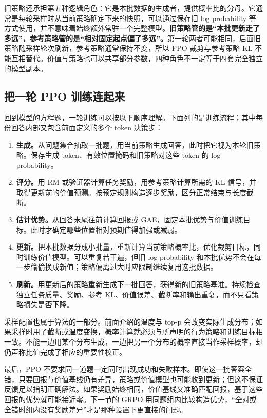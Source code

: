 旧策略还承担第五种逻辑角色：它是本批数据的生成者，提供概率比的分母。它通常是每轮采样时从当前策略确定下来的快照，可以通过保存旧 log probability 等方式使用，并不意味着始终额外常驻一个完整模型。\textbf{旧策略管的是``本批更新走了多远''，参考策略管的是``相对固定起点偏了多远''。}第一轮两者可能相同，后面旧策略随采样轮次刷新，参考策略通常保持不变，所以 PPO 裁剪与参考策略 KL 不能互相替代。价值与策略也可以共享部分参数，四种角色不一定等于四套完全独立的模型副本。

\subsection{把一轮 PPO 训练连起来}

回到模型的方程题，一轮训练可以按以下顺序理解。下面列的是训练流程；其中每份回答内部又包含前面定义的多个 token 决策步：
\begin{enumerate}
    \item \textbf{生成。}从问题集合抽取一批题，用当前策略生成回答，此时把它视为本轮旧策略。保存生成 token、有效位置掩码和旧策略对这些 token 的 log probability。
    \item \textbf{评分。}用 RM 或验证器计算任务奖励，用参考策略计算所需的 KL 信号，并取得更新前的价值预测。按预定规则构造逐步奖励，区分正常结束与长度截断。
    \item \textbf{估计优势。}从回答末尾往前计算回报或 GAE，固定本批优势与价值训练目标。此时才确定哪些位置相对预期值得加强或减弱。
    \item \textbf{更新。}把本批数据分成小批量，重新计算当前策略概率比，优化裁剪目标，同时训练价值模型。可以重复若干遍，但旧 log probability 和本批优势不会在每一步偷偷换成新值；策略偏离过大时应限制继续复用这批数据。
    \item \textbf{刷新。}用更新后的策略重新生成下一批回答，获得新的旧策略基准。持续检查独立任务质量、奖励、参考 KL、价值误差、截断率和输出重复，而不只看策略损失是否下降。
\end{enumerate}

采样配置也属于算法的一部分。前面介绍的温度与 top-p 会改变实际生成分布；如果采样时用了截断或温度变换，概率计算就必须与所声明的行为策略和训练目标相一致。不能一边用某个分布生成，一边把另一个分布的概率直接当作采样概率，却仍声称比值完成了相应的重要性校正。

最后，PPO 不要求同一道题一定同时出现成功和失败样本。即使这一批答案全错，只要回报与价值基线仍有差异，策略或价值模型也可能收到更新；但这不保证反馈足以指明正确解法。如果奖励始终相同，价值基线又准确匹配回报，基于这些回报的优势就可能接近零。下一节的 GRPO 用同题组内比较构造优势，``全对或全错时组内没有奖励差异''才是那种设置下更直接的问题。

